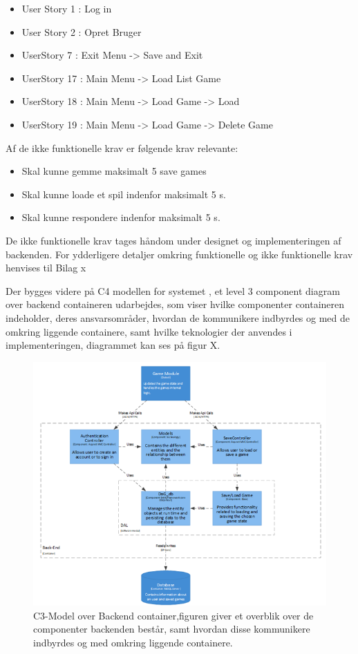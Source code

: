 \begin{itemize}
\item User Story 1 : Log in
\item User Story 2 : Opret Bruger
\item UserStory 7 : Exit Menu -> Save and Exit
\item UserStory 17 : Main Menu -> Load List Game
\item UserStory 18 : Main Menu -> Load Game -> Load
\item UserStory 19 : Main Menu -> Load Game -> Delete Game
\end{itemize}
Af de ikke funktionelle krav er følgende krav relevante:
\begin{itemize}
\item Skal kunne gemme maksimalt 5 save games
\item Skal kunne loade et spil indenfor maksimalt 5 s.
\item Skal kunne respondere indenfor maksimalt 5 s.
\end{itemize}
De ikke funktionelle krav tages håndom under designet og implementeringen af backenden.
For ydderligere detaljer omkring funktionelle og ikke funktionelle krav henvises til Bilag x


Der bygges videre på C4 modellen for systemet , et level 3 component diagram over backend containeren udarbejdes, som viser hvilke componenter containeren indeholder, deres ansvarsområder, hvordan de kommunikere indbyrdes og med de omkring liggende containere, samt hvilke teknologier der anvendes i implementeringen, diagrammet kan ses på figur X. 


\begin{figure}[h]
\centering
\includegraphics[width = \textwidth]{02-Body/Images/Backend_C3.PNG}
\caption{C3-Model over Backend container,figuren giver et overblik over de componenter backenden består, samt hvordan disse kommunikere indbyrdes og med omkring liggende containere.}
\label{fig:Arkitektur-Backend-C3}
\end{figure}

